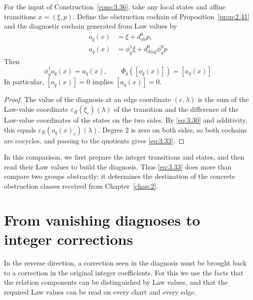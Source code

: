 \begin{theorem}\label{thm:3.37}

For the input of Construction~\ref{cons:3.36}, take any local states and affine
transitions $x=(\xi,p)$.
Define the obstruction cochain of Proposition~\ref{prop:2.41} and the diagnostic
cochain generated from Law values by
\begin{equation*}
\begin{aligned}
o_q(x)&=\xi+d_{\mathrm{ob}}^0p,\\
a_q(x)&=\phi_q^1\xi+d_{\mathrm{diag}}^0\phi_q^0p
\end{aligned}
\tag{3.32}\label{eq:3.32}
\end{equation*}
Then
\begin{equation*}
\phi_q^1o_q(x)=a_q(x),\qquad
\Phi_q([o_q(x)])=[a_q(x)]
\tag{3.33}\label{eq:3.33}
\end{equation*}
In particular, $[o_q(x)]=0$ implies $[a_q(x)]=0$.

\end{theorem}

\begin{proof}

The value of the diagnosis at an edge coordinate $(e,\lambda)$ is the sum of the
Law-value coordinate $\varepsilon_R(\xi_e)(\lambda)$ of the transition and the
difference of the Law-value coordinates of the states on the two sides.
By \eqref{eq:3.30} and additivity, this equals $\varepsilon_R(o_q(x)_e)(\lambda)$.
Degree 2 is zero on both sides, so both cochains are cocycles, and passing to the
quotients gives \eqref{eq:3.33}.

\end{proof}

In this comparison, we first prepare the integer transitions and states, and then
read their Law values to build the diagnosis.
Thus \eqref{eq:3.33} does more than compare two groups abstractly: it determines the
destination of the concrete obstruction classes received from
Chapter~\ref{chap:2}.

\section{From vanishing diagnoses to integer corrections}\label{sec:3.10}

In the reverse direction, a correction seen in the diagnosis must be brought back to
a correction in the original integer coefficients.
For this we use the facts that the relation components can be distinguished by Law
values, and that the required Law values can be read on every chart and every edge.

